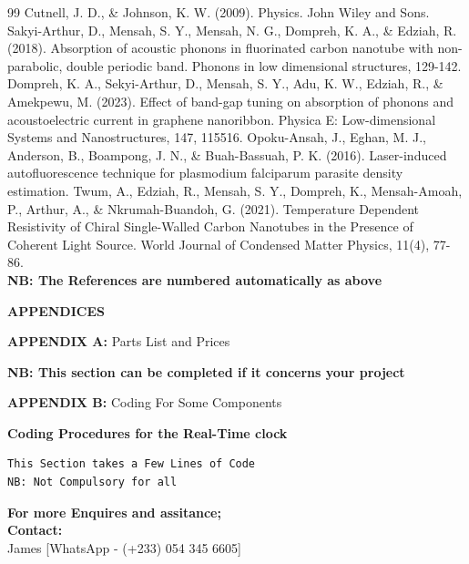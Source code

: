 \documentclass[12pt,a4paper]{report}
\begin{document}

\begin{thebibliography}{99}
Cutnell, J. D., \& Johnson, K. W. (2009). Physics. John Wiley and Sons.
Sakyi-Arthur, D., Mensah, S. Y., Mensah, N. G., Dompreh, K. A., \& Edziah, R. (2018). Absorption of acoustic phonons in fluorinated carbon nanotube with non-parabolic, double periodic band. Phonons in low dimensional structures, 129-142.
Dompreh, K. A., Sekyi-Arthur, D., Mensah, S. Y., Adu, K. W., Edziah, R., \& Amekpewu, M. (2023). Effect of band-gap tuning on absorption of phonons and acoustoelectric current in graphene nanoribbon. Physica E: Low-dimensional Systems and Nanostructures, 147, 115516.
Opoku-Ansah, J., Eghan, M. J., Anderson, B., Boampong, J. N., \& Buah-Bassuah, P. K. (2016). Laser-induced autofluorescence technique for plasmodium falciparum parasite density estimation.
Twum, A., Edziah, R., Mensah, S. Y., Dompreh, K., Mensah-Amoah, P., Arthur, A., \& Nkrumah-Buandoh, G. (2021). Temperature Dependent Resistivity of Chiral Single-Walled Carbon Nanotubes in the Presence of Coherent Light Source. World Journal of Condensed Matter Physics, 11(4), 77-86.\\
\textbf{NB: The References are numbered automatically as above}
\end{thebibliography}

\newpage
\begin{center}
 \Large\textbf{APPENDICES}
\end{center}
\large \textbf{APPENDIX A:} Parts List and Prices
\begin{table}[htbp]
\textbf{NB: This section can be completed if it concerns your project}
\end{table}
\newpage
\begin{center}
    \Large\raggedright\textbf{APPENDIX B:} Coding For Some Components\\
\end{center}
\raggedright\textbf{Coding Procedures for the Real-Time clock}
\begin{lstlisting}
This Section takes a Few Lines of Code
NB: Not Compulsory for all
\end{lstlisting}

\newpage
\begin{center}
    \Large\textbf{For more Enquires and assitance;}\\
    \textbf{Contact:}\\
    James [WhatsApp - (+233) 054 345 6605]
\end{center}
\end{document}

